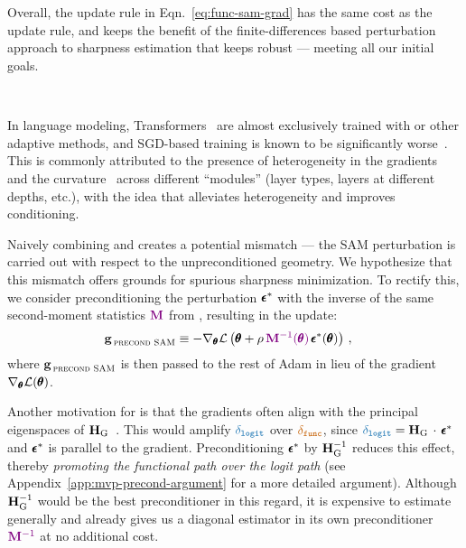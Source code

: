Overall, the update rule in Eqn.~\ref{eq:func-sam-grad} has the same cost as the \SAM update rule, and keeps the benefit of the finite-differences based perturbation approach to sharpness
estimation that keeps \SAM robust --- meeting all our initial goals.


\subsection{$\,$\precondSAM}
In language modeling, Transformers~\citep{vaswani2017attention} are almost exclusively trained with \adamw or other adaptive methods, and SGD-based training is known to be significantly worse~\citep{liu2020understanding}. This is commonly attributed to the presence of heterogeneity in the gradients~\citep{liu2020understanding,noci2022signal,pan2023toward} and the curvature~\citep{zhang2024transformersneedadamhessian,ormaniec2024doesmeantransformerinsights,jiang2024does} across different ``modules'' (layer types, layers at different depths, etc.),
with the idea that \adamw alleviates heterogeneity and improves conditioning.

Naively combining \SAM and \adamw creates a potential mismatch ---
the SAM perturbation is carried out with respect to the unpreconditioned geometry. We hypothesize that this mismatch offers
grounds for spurious sharpness minimization.
To rectify this, we consider preconditioning the perturbation ${\pmb \epsilon}^\ast$ with the inverse of the same second-moment statistics $\textcolor{violet}{{\bf M}}$ from \adamw, resulting in the update:
\begin{align}\label{eq:precond-sam-update}
  & {\boldsymbol{\mathbf{g}}}_{\,{{\textsc{precond SAM}} }} \equiv - \nabla_{\pmb \theta} {\mathcal{L}}\left({\pmb \theta} + \rho\, \textcolor{violet}{{\bf M}^{-1}({\pmb \theta})} \, {\pmb \epsilon}^\ast({\pmb \theta})\right)\,,
\end{align}
where ${\boldsymbol{\mathbf{g}}}_{\,{{\textsc{precond SAM}} }}$ is then passed to the rest of Adam in lieu of the gradient $\nabla_{\pmb \theta}{\mathcal{L}}({\pmb \theta})$. 

Another motivation for \precondSAM is that the gradients often align with the principal eigenspaces of $\mathbf{H}_{\mathrm{G}}$~\citep{gur2018gradient}. This would amplify
$\lcolor{\glog}$ over $\fcolor{\gfun}$, since $\lcolor{\glog} = {\HG}\,\cdot\,\beps^\ast$ and ${\pmb \epsilon}^*$ is parallel to the gradient.
Preconditioning ${\pmb \epsilon}^\ast$ by $\mathbf{H}_{\mathrm{G}}^{-1}$ reduces this effect,
thereby \emph{promoting the functional
path over the logit path} (see Appendix~\ref{app:mvp-precond-argument} for a more detailed argument).
Although $\mathbf{H}_{\mathrm{G}}^{-1}$ would be the best preconditioner in this regard, it is expensive to estimate generally and
\adamw already gives us a diagonal estimator in its own preconditioner $\textcolor{violet}{{\bf M}^{-1}}$ at no additional cost.

